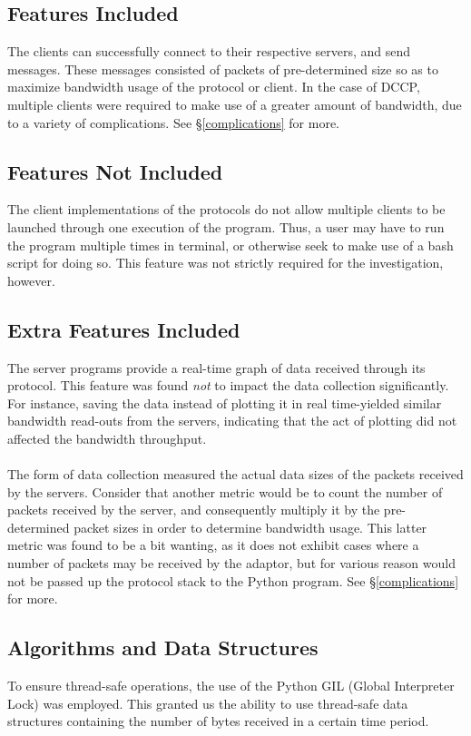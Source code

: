 \documentclass[10pt,a4paper]{article}
\begin{document}
\subsection{Features Included}
The clients can successfully connect to their respective servers, and send messages. These messages consisted of packets
of pre-determined size so as to maximize bandwidth usage of the protocol or client. In the case of DCCP, multiple clients were required
to make use of a greater amount of bandwidth, due to a variety of complications. See \S\ref{complications} for more. 

\subsection{Features Not Included}
The client implementations of the protocols do not allow multiple clients to be launched through one
execution of the program. Thus, a user may have to run the program multiple times in terminal, or otherwise
seek to make use of a bash script for doing so. This feature was not strictly required for the investigation, however.

\subsection{Extra Features Included}
The server programs provide a real-time graph of data received through its protocol. This feature was found \emph{not} to impact the
data collection significantly. For instance, saving the data instead of plotting it in real time-yielded similar bandwidth read-outs
from the servers, indicating that the act of plotting did not affected the bandwidth throughput. 
\paragraph{}
The form of data collection measured the actual data sizes of the packets received by the servers. Consider that another metric 
would be to count the number of packets received by the server, and consequently multiply it by the pre-determined packet sizes
in order to determine bandwidth usage. This latter metric was found to be a bit wanting, as it does not exhibit cases where a number
of packets may be received by the adaptor, but for various reason would not be passed up the protocol stack to the Python program. See
\S\ref{complications} for more. 

\subsection{Algorithms and Data Structures}
To ensure thread-safe operations, the use of the Python GIL (Global Interpreter Lock) was employed. This granted us
the ability to use thread-safe data structures containing the number of bytes received in a certain time period. 
\end{document}
